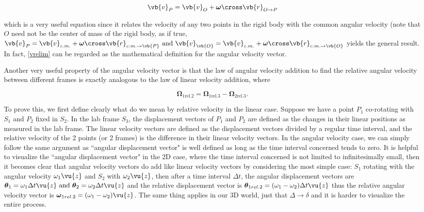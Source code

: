 \documentclass[a4paper,12pt]{report}
\begin{document}
\begin{equation}
	\vb{v} _{P} = \vb{v} _{O} + \boldsymbol{\omega } \cross \vb{r} _{O \rightarrow  P} \label{vrelim} 
\end{equation}

which is a very useful equation since it relates the velocity of any two points in the rigid body with the common angular velocity (note that \(O \) need not be the center of mass of the rigid body, as if true, \(\vb{v} _{P} = \vb{v} _{c.m. } + \boldsymbol{\omega } \cross \vb{r} _{c.m. \rightarrow \vb{P} } \text{ and } \vb{v} _{\vb{O}}  = \vb{v} _{c.m. } + \boldsymbol{\omega } \cross \vb{r} _{c.m. \rightarrow \vb{O} }   \) yields the general result. In fact, \cref{vrelim} can be regarded as the mathematical definition for the angular velocity vector.

Another very useful property of the angular velocity vector is that the law of angular velocity addition to find the relative angular velocity between different frames is exactly analogous to the law of linear velocity addition, where

\begin{equation}
	\boldsymbol{\Omega }  _{1 \text{rel.} 2} = \boldsymbol{\Omega} _{ 1 \text{rel.} 3}- \boldsymbol{\Omega }_{ 2 \text{rel.} 3}. \label{avad} 
\end{equation}

To prove this, we first define clearly what do we mean by relative velocity in the linear case. Suppose we have a point \(P_1\) co-rotating with \(S_1\) and \(P_2\) fixed in \(S_2\). In the lab frame \(S_3\), the displacement vectors of \(P_1\) and \(P_2\) are defined as the changes in their linear positions as measured in the lab frame. The linear velocity vectors are defined as the displacement vectors divided by a regular time interval, and the relative velocity of the 2 points (or 2 frames) is the difference in their linear velocity vectors. In the angular velocity case, we can simply follow the same argument as ``angular displacement vector" is well defined as long as the time interval concerned tends to zero. It is helpful to visualize the ``angular displacement vector" in the 2D case, where the time interval concerned is not limited to infinitesimally small, then it becomes clear that angular velocity vectors do add like linear velocity vectors by considering the most simple case: \(S_1\) rotating with the angular velocity \(\omega _{1} \vu{z} \) and \(S_2\) with \(\omega _{2} \vu{z} \), then after a time interval \(\Delta t\), the angular displacement vectors are \(\boldsymbol{\theta } _{1}  = \omega _{1}  \Delta t \vu{z} \text{ and } \boldsymbol{\theta } _{2}   = \omega _{2} \Delta t \vu{z} \) and the relative displacement vector is \(\boldsymbol{\theta }  _{1 rel. 2} = (\omega _{1} - \omega _{2}) \Delta t \vu{z} \) thus the relative angular velocity vector is \(\boldsymbol{\omega }  _{1 rel. 2} = (\omega _{1} - \omega _{2} )\vu{z} \). The same thing applies in our 3D world, just that \(\Delta \rightarrow \delta \) and it is harder to visualize the entire process. 
\end{document}
